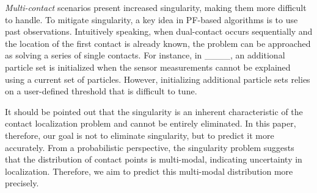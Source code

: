 \textit{Multi-contact} scenarios present increased singularity, making them more difficult to handle.
To mitigate singularity, a key idea in PF-based algorithms is to use past observations.
Intuitively speaking, when dual-contact occurs sequentially and the location of the first contact is already known, the problem can be approached as solving a series of single contacts.
For instance, in ____, an additional particle set is initialized when the sensor measurements cannot be explained using a current set of particles.
However, initializing additional particle sets relies on a user-defined threshold that is difficult to tune. 


It should be pointed out that the singularity is an inherent characteristic of the contact localization problem and cannot be entirely eliminated.
In this paper, therefore, our goal is not to eliminate singularity, but to predict it more accurately.
From a probabilistic perspective, the singularity problem suggests that the distribution of contact points is multi-modal, indicating uncertainty in localization.
Therefore, we aim to predict this multi-modal distribution more precisely.
